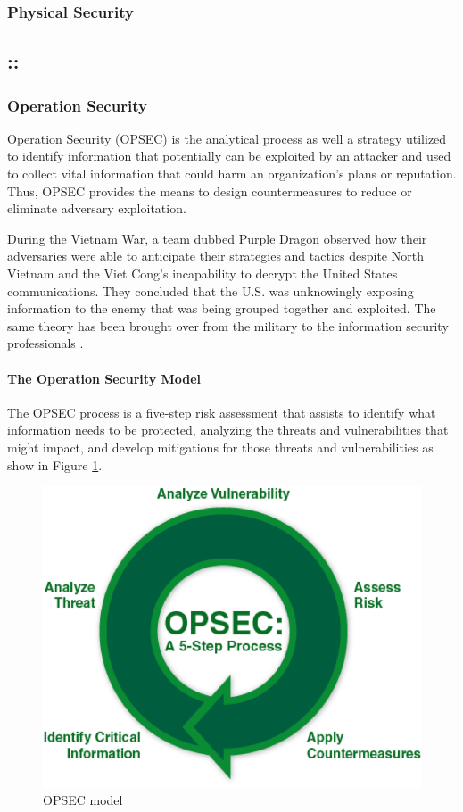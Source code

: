 \subsubsection{Physical Security}

\subsection{::}

\subsubsection{Operation Security}\label{sec:opsec}
Operation Security (OPSEC) is the analytical process as well a strategy utilized to identify information that potentially can be exploited by an attacker and used to collect vital information that could harm an organization's plans or reputation. Thus, OPSEC provides the means to design countermeasures to reduce or eliminate adversary exploitation.

During the Vietnam War, a team dubbed Purple Dragon observed how their adversaries were able to anticipate their strategies and tactics despite North Vietnam and the Viet Cong's incapability to decrypt the United States communications. They concluded that the U.S. was unknowingly exposing information to the enemy that was being grouped together and exploited. The same theory has been brought over from the military to the information security professionals \cite{tunggal_what_2021}.

\paragraph{The Operation Security Model}
The OPSEC process is a five-step risk assessment that assists to identify what information needs to be protected, analyzing the threats and vulnerabilities that might impact, and develop mitigations for those threats and vulnerabilities as show in Figure \ref{fig:opsec}.

\begin{figure}[!h]
    \centering
    \includegraphics[width=.5\textwidth]{../../img/chapter_2/opsec-model.png}
    \caption{OPSEC model}
    \label{fig:opsec}
\end{figure}

